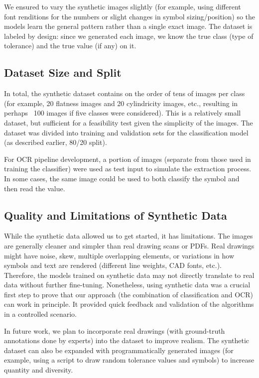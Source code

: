 \documentclass[11pt,a4paper]{article}
\begin{document}
We ensured to vary the synthetic images slightly (for example, using different font renditions for the numbers or slight changes in symbol sizing/position) so the models learn the general pattern rather than a single exact image. The dataset is labeled by design: since we generated each image, we know the true class (type of tolerance) and the true value (if any) on it.

\subsection*{Dataset Size and Split}
In total, the synthetic dataset contains on the order of tens of images per class (for example, 20 flatness images and 20 cylindricity images, etc., resulting in perhaps ~100 images if five classes were considered). This is a relatively small dataset, but sufficient for a feasibility test given the simplicity of the images. The dataset was divided into training and validation sets for the classification model (as described earlier, 80/20 split). 

For OCR pipeline development, a portion of images (separate from those used in training the classifier) were used as test input to simulate the extraction process. In some cases, the same image could be used to both classify the symbol and then read the value.

\subsection*{Quality and Limitations of Synthetic Data}
While the synthetic data allowed us to get started, it has limitations. The images are generally cleaner and simpler than real drawing scans or PDFs. Real drawings might have noise, skew, multiple overlapping elements, or variations in how symbols and text are rendered (different line weights, CAD fonts, etc.). Therefore, the models trained on synthetic data may not directly translate to real data without further fine-tuning. Nonetheless, using synthetic data was a crucial first step to prove that our approach (the combination of classification and OCR) can work in principle. It provided quick feedback and validation of the algorithms in a controlled scenario.

In future work, we plan to incorporate real drawings (with ground-truth annotations done by experts) into the dataset to improve realism. The synthetic dataset can also be expanded with programmatically generated images (for example, using a script to draw random tolerance values and symbols) to increase quantity and diversity.
\end{document}

